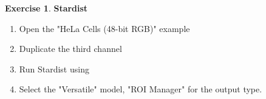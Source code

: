 \documentclass[xcolor=table,DIV=19,twocolumn]{scrartcl}
\theoremstyle{definition}
\newtheorem{exercice}{Exercise}
\begin{document}
\begin{exercice} \textbf{Stardist}
  \begin{enumerate}
    \item Open the "HeLa Cells (48-bit RGB)" example
    \item Duplicate the third channel 
    \item Run Stardist using 
    \item Select the "Versatile" model, "ROI Manager" for the output type. 
  \end{enumerate}
\end{exercice} 
\end{document}
